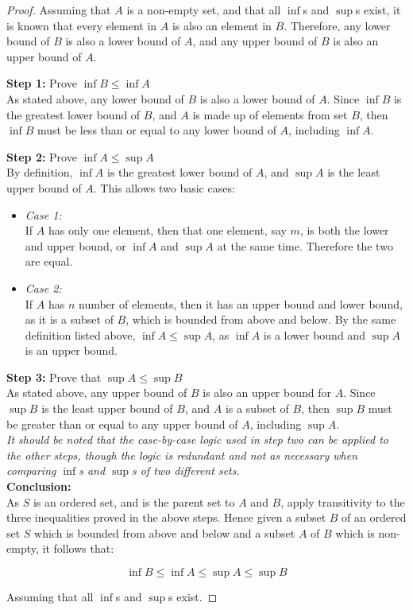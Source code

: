 \documentclass[12pt]{article}
\begin{document}
\begin{proof}
Assuming that $A$ is a non-empty set, and that all $\inf$s and $\sup$s exist, it is known that every element in $A$ is also an element in $B$. Therefore, any lower bound of $B$ is also a lower bound of $A$, and any upper bound of $B$ is also an upper bound of $A$.

\textbf{Step 1:} Prove $\inf B \le \inf A$ \\
As stated above, any lower bound of $B$ is also a lower bound of $A$. Since $\inf B$ is the greatest lower bound of $B$, and $A$ is made up of elements from set $B$, then $\inf B$ must be less than or equal to any lower bound of $A$, including $\inf A$.

\textbf{Step 2:} Prove $\inf A \le \sup A$ \\
By definition, $\inf A$ is the greatest lower bound of $A$, and $\sup A$ is the least upper bound of $A$. This allows two basic cases:
\begin{itemize}
\item \textit{Case 1:} \\
If $A$ has only one element, then that one element, say $m$, is both the lower and upper bound, or $\inf A$ and $\sup A$ at the same time. Therefore the two are equal.

\item \textit{Case 2:} \\
If $A$ has $n$ number of elements, then it has an upper bound and lower bound, as it is a subset of $B$, which is bounded from above and below. By the same definition listed above, $\inf A \le \sup A$, as $\inf A$ is a lower bound and $\sup A$ is an upper bound. 
\end{itemize}

\textbf{Step 3:} Prove that $\sup A \le \sup B$ \\
As stated above, any upper bound of $B$ is also an upper bound for $A$. Since $\sup B$ is the least upper bound of $B$, and $A$ is a subset of $B$, then $\sup B$ must be greater than or equal to any upper bound of $A$, including $\sup A$. \\

\noindent \textit{It should be noted that the case-by-case logic used in step two can be applied to the other steps, though the logic is redundant and not as necessary when comparing $\inf$s and $\sup$s of two different sets.} \\

\textbf{Conclusion:} \\
As $S$ is an ordered set, and is the parent set to $A$ and $B$, apply transitivity to the three inequalities proved in the above steps. Hence given a subset $B$ of an ordered set $S$ which is bounded from above and below and a subset $A$ of $B$ which is non-empty, it follows that:

\begin{equation*}
	\inf B \le \inf A \le \sup A \le \sup B
\end{equation*}

\noindent Assuming that all $\inf$s and $\sup$s exist.
\end{proof}
\end{document}
